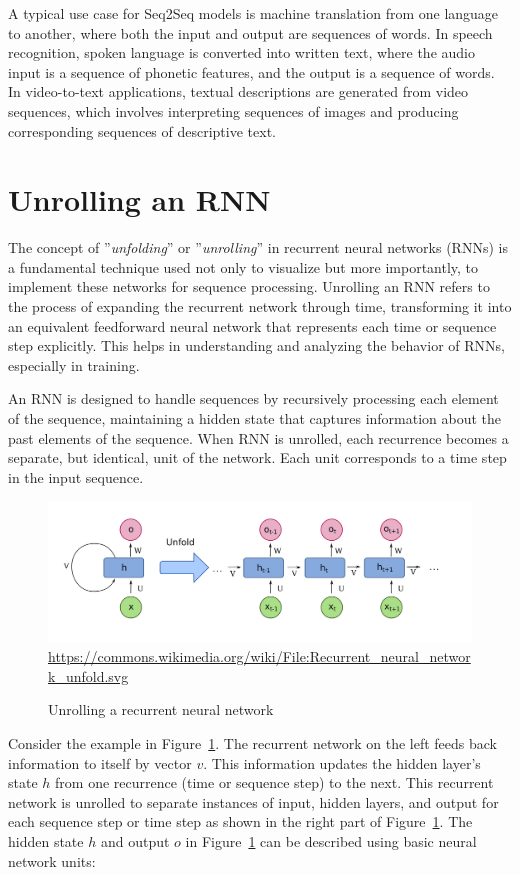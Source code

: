 A typical use case for Seq2Seq models is machine translation from one language to another, where both the input and output are sequences of words. In speech recognition, spoken language is converted into written text, where the audio input is a sequence of phonetic features, and the output is a sequence of words. In video-to-text applications, textual descriptions are generated from video sequences, which involves interpreting sequences of images and producing corresponding sequences of descriptive text.

\section{Unrolling an RNN}

The concept of ''\emph{unfolding}'' or ''\emph{unrolling}'' in recurrent neural networks (RNNs) is a fundamental technique used not only to visualize but more importantly, to implement these networks for sequence processing. Unrolling an RNN refers to the process of expanding the recurrent network through time, transforming it into an equivalent feedforward neural network that represents each time or sequence step explicitly. This helps in understanding and analyzing the behavior of RNNs, especially in training.

An RNN is designed to handle sequences by recursively processing each element of the sequence, maintaining a hidden state that captures information about the past elements of the sequence. When RNN is unrolled, each recurrence becomes a separate, but identical, unit of the network. Each unit corresponds to a time step in the input sequence.

\begin{figure}
\centering
\includegraphics[width=\textwidth]{rnn.png}
\scriptsize \url{https://commons.wikimedia.org/wiki/File:Recurrent_neural_network_unfold.svg}
\caption{Unrolling a recurrent neural network}
\label{fig:unrolling}
\end{figure}

Consider the example in Figure~\ref{fig:unrolling}. The recurrent network on the left feeds back information to itself by vector $v$. This information updates the hidden layer's state $h$ from one recurrence (time or sequence step) to the next. This recurrent network is unrolled to separate instances of input, hidden layers, and output for each sequence step or time step as shown in the right part of Figure~\ref{fig:unrolling}. The hidden state $h$ and output $o$ in Figure~\ref{fig:unrolling} can be described using basic neural network units:

